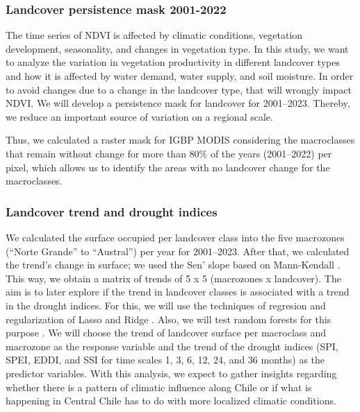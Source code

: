 \documentclass[
  authoryear,
  preprint,
  3p,
  onecolumn]{elsarticle}
\begin{document}
\hypertarget{landcover-persistence-mask-2001-2022}{%
\subsubsection{Landcover persistence mask
2001-2022}\label{landcover-persistence-mask-2001-2022}}

The time series of NDVI is affected by climatic conditions, vegetation
development, seasonality, and changes in vegetation type. In this study,
we want to analyze the variation in vegetation productivity in different
landcover types and how it is affected by water demand, water supply,
and soil moisture. In order to avoid changes due to a change in the
landcover type, that will wrongly impact NDVI. We will develop a
persistence mask for landcover for 2001--2023. Thereby, we reduce an
important source of variation on a regional scale.

Thus, we calculated a raster mask for IGBP MODIS considering the
macroclasses that remain without change for more than 80\% of the years
(2001--2022) per pixel, which allows us to identify the areas with no
landcover change for the macroclasses.

\hypertarget{landcover-trend-and-drought-indices}{%
\subsubsection{Landcover trend and drought
indices}\label{landcover-trend-and-drought-indices}}

We calculated the surface occupied per landcover class into the five
macrozones (``Norte Grande'' to ``Austral'') per year for 2001--2023.
After that, we calculated the trend's change in surface; we used the
Sen' slope \citep{Sen1968} based on Mann-Kendall \citep{Kendall1975}.
This way, we obtain a matrix of trends of 5 x 5 (macrozones x
landcover). The aim is to later explore if the trend in landcover
classes is associated with a trend in the drought indices. For this, we
will use the techniques of regresion and regularization of Lasso
\citep{Tibshirani2010} and Ridge \citep{Hoerl1970}. Also, we will test
random forests for this purpose \citep{Ho1995}. We will choose the trend
of landcover surface per macroclass and macrozone as the response
variable and the trend of the drought indices (SPI, SPEI, EDDI, and SSI
for time scales 1, 3, 6, 12, 24, and 36 months) as the predictor
variables. With this analysis, we expect to gather insights regarding
whether there is a pattern of climatic influence along Chile or if what
is happening in Central Chile has to do with more localized climatic
conditions.
\end{document}
